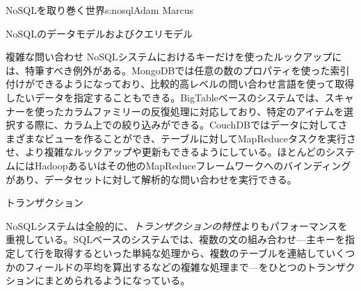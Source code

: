\begin{aosachapter}{NoSQLを取り巻く世界}{s:nosql}{Adam Marcus}
\begin{aosasect1}{NoSQLのデータモデルおよびクエリモデル}
\begin{aosasect2}{複雑な問い合わせ}
NoSQLシステムにおけるキーだけを使ったルックアップには、特筆すべき例外がある。MongoDBでは任意の数のプロパティを使った索引付けができるようになっており、比較的高レベルの問い合わせ言語を使って取得したいデータを指定することもできる。BigTableベースのシステムでは、スキャナーを使ったカラムファミリーの反復処理に対応しており、特定のアイテムを選択する際に、カラム上での絞り込みができる。CouchDBではデータに対してさまざまなビューを作ることができ、テーブルに対してMapReduceタスクを実行させ、より複雑なルックアップや更新もできるようにしている。ほとんどのシステムにはHadoopあるいはその他のMapReduceフレームワークへのバインディングがあり、データセットに対して解析的な問い合わせを実行できる。

\end{aosasect2}

\begin{aosasect2}{トランザクション}

NoSQLシステムは全般的に、\emph{トランザクションの特性}よりもパフォーマンスを重視している。SQLベースのシステムでは、複数の文の組み合わせ---主キーを指定して行を取得するといった単純な処理から、複数のテーブルを連結していくつかのフィールドの平均を算出するなどの複雑な処理まで---をひとつのトランザクションにまとめられるようになっている。


\end{aosasect2}
\end{aosasect1}
\end{aosachapter}
